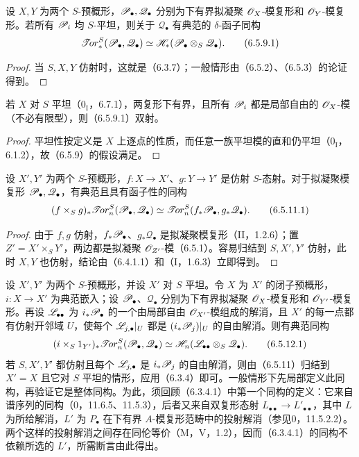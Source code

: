 设 $X,Y$ 为两个 $S$-预概形，$\mathscr P_\bullet,\mathscr Q_\bullet$ 分别为下有界拟凝聚 $\mathscr O_X$-模复形和 $\mathscr O_Y$-模复形。若所有 $\mathscr P_i$ 均 $S$-平坦，则关于 $\mathscr Q_\bullet$ 有典范的 $\delta$-函子同构
\begin{equation}
 \mathscr{T}\!or_*^S(\mathscr P_\bullet,\mathscr Q_\bullet)
 \simeq\mathscr H_*(\mathscr P_\bullet\otimes_S\mathscr Q_\bullet).
 \tag{6.5.9.1}
\end{equation}
\begin{proof}
当 $S,X,Y$ 仿射时，这就是（6.3.7）；一般情形由（6.5.2）、（6.5.3）的论证得到。
\end{proof}

若 $X$ 对 $S$ 平坦（$0_{\mathrm I}$，6.7.1），两复形下有界，且所有 $\mathscr P_i$ 都是局部自由的 $\mathscr O_X$-模（不必有限型），则（6.5.9.1）双射。
\begin{proof}
平坦性按定义是 $X$ 上逐点的性质，而任意一族平坦模的直和仍平坦（$0_{\mathrm I}$，6.1.2），故（6.5.9）的假设满足。
\end{proof}

设 $X',Y'$ 为两个 $S$-预概形，$f:X\to X'$、$g:Y\to Y'$ 是仿射 $S$-态射。对于拟凝聚模复形 $\mathscr P_\bullet,\mathscr Q_\bullet$，有典范且具有函子性的同构
\begin{equation}
 (f\times_S g)_*\mathscr{T}\!or_n^S(\mathscr P_\bullet,\mathscr Q_\bullet)
 \simeq\mathscr{T}\!or_n^S(f_*\mathscr P_\bullet,g_*\mathscr Q_\bullet).
 \tag{6.5.11.1}
\end{equation}
\begin{proof}
由于 $f,g$ 仿射，$f_*\mathscr P_\bullet$、$g_*\mathscr Q_\bullet$ 是拟凝聚模复形（II，1.2.6）；置 $Z'=X'\times_S Y'$，两边都是拟凝聚 $\mathscr O_{Z'}$-模（6.5.1）。容易归结到 $S,X',Y'$ 仿射，此时 $X,Y$ 也仿射，结论由（6.4.1.1）和（I，1.6.3）立即得到。
\end{proof}

设 $X',Y'$ 为两个 $S$-预概形，并设 $X'$ 对 $S$ 平坦。令 $X$ 为 $X'$ 的闭子预概形，$i:X\to X'$ 为典范嵌入；设 $\mathscr P_\bullet$、$\mathscr Q_\bullet$ 分别为下有界拟凝聚 $\mathscr O_X$-模复形和 $\mathscr O_{Y'}$-模复形。再设 $\mathscr L_{\bullet\bullet}$ 为 $i_*\mathscr P_\bullet$ 的一个由局部自由 $\mathscr O_{X'}$-模组成的解消，且 $X'$ 的每一点都有仿射开邻域 $U$，使每个 $\mathscr L_{j,\bullet}|_U$ 都是 $(i_*\mathscr P_j)|_U$ 的自由解消。则有典范同构
\begin{equation}
 (i\times_S1_{Y'})_*\mathscr{T}\!or_n^S(\mathscr P_\bullet,\mathscr Q_\bullet)
 \simeq\mathscr H_n(\mathscr L_{\bullet\bullet}\otimes_S\mathscr Q_\bullet).
 \tag{6.5.12.1}
\end{equation}
若 $S,X',Y'$ 都仿射且每个 $\mathscr L_{j,\bullet}$ 是 $i_*\mathscr P_j$ 的自由解消，则由（6.5.11）归结到 $X'=X$ 且它对 $S$ 平坦的情形，应用（6.3.4）即可。一般情形下先局部定义此同构，再验证它是整体同构。为此，须回顾（6.3.4.1）中第一个同构的定义：它来自谱序列的同构（0，11.6.5、11.5.3），后者又来自双复形态射 $L_{\bullet\bullet}\to L'_{\bullet\bullet}$，其中 $L$ 为所给解消，$L'$ 为 $P_\bullet$ 在下有界 $A$-模复形范畴中的投射解消（参见0，11.5.2.2）。两个这样的投射解消之间存在同伦等价（M，V，1.2），因而（6.3.4.1）的同构不依赖所选的 $L'$，所需断言由此得出。

